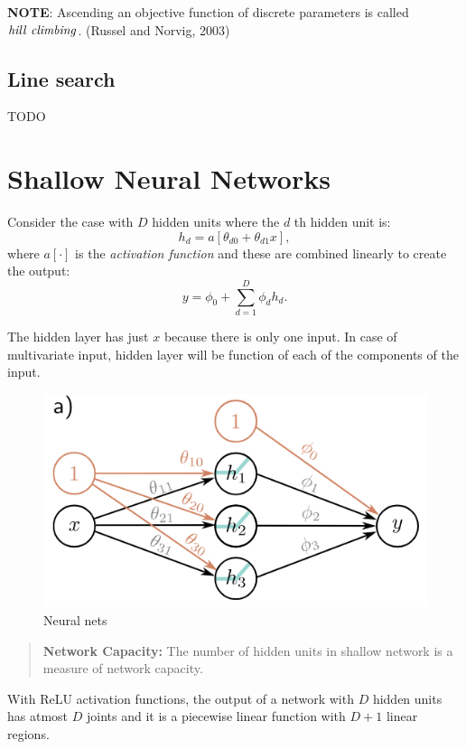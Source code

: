 \documentclass[12pt,reqno]{amsart}
\theoremstyle{plain}
\theoremstyle{definition}
\begin{document}
\textbf{NOTE}: Ascending an objective function of discrete parameters is
called \({\it hill~climbing}\). (Russel and Norvig, 2003)

\subsection{Line search}\label{line-search}

TODO

\section{Shallow Neural Networks}\label{shallow-neural-networks}
Consider the case with \(D\) hidden units where the \(d\) th hidden unit
is: \[ h_d = a[\theta_{d0} + \theta_{d1}x],\] where \(a[\cdot]\) is the
\emph{activation function} and these are combined linearly to create the
output: \[ y = \phi_0 + \sum\limits_{d=1}^{D} \phi_dh_d.\]

The hidden layer has just \(x\) because there is only one input. In case
of multivariate input, hidden layer will be function of each of the
components of the input.

\begin{figure}[!ht]
    \centering
    \includegraphics[scale=.36]{../assets/dl/neural_net.png}
    \caption{Neural nets}
\end{figure}

\begin{quote}
{\bf Network Capacity:} The number of hidden units in shallow
network is a measure of network capacity.
\end{quote}
With ReLU activation functions, the output of a network with \(D\) hidden units has atmost \(D\) joints and it is a piecewise linear function with \(D+1\) linear regions.
\end{document}
